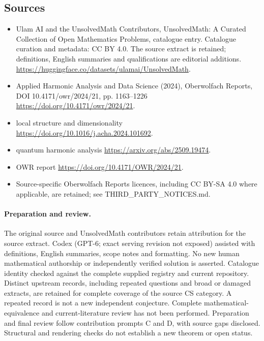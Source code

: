 \documentclass[11pt]{article}
\begin{document}
\subsection{Sources}
\begin{itemize}
\item[\hypertarget{source:statement:1}{S1}] Ulam AI and the UnsolvedMath Contributors, UnsolvedMath: A Curated Collection of Open Mathematics Problems, catalogue entry. Catalogue curation and metadata: CC BY 4.0. The source extract is retained; definitions, English summaries and qualifications are editorial additions.
\url{https://huggingface.co/datasets/ulamai/UnsolvedMath}.
\item[\hypertarget{source:statement:2}{S2}] Applied Harmonic Analysis and Data Science (2024), Oberwolfach Reports, DOI 10.4171/owr/2024/21, pp. 1163--1226
\url{https://doi.org/10.4171/owr/2024/21}.
\item[\hypertarget{source:statement:3}{S3}] local structure and dimensionality
\url{https://doi.org/10.1016/j.acha.2024.101692}.
\item[\hypertarget{source:statement:4}{S4}] quantum harmonic analysis
\url{https://arxiv.org/abs/2509.19474}.
\item[\hypertarget{source:statement:5}{S5}] OWR report
\url{https://doi.org/10.4171/OWR/2024/21}.
\item Source-specific Oberwolfach Reports licences, including CC BY-SA 4.0 where applicable, are retained; see THIRD\_PARTY\_NOTICES.md.
\end{itemize}
\paragraph{Preparation and review.}
The original source and UnsolvedMath contributors retain attribution for the source extract. Codex (GPT-6; exact serving revision not exposed) assisted with definitions, English summaries, scope notes and formatting. No new human mathematical authorship or independently verified solution is asserted. Catalogue identity checked against the complete supplied registry and current repository. Distinct upstream records, including repeated questions and broad or damaged extracts, are retained for complete coverage of the source CS category. A repeated record is not a new independent conjecture. Complete mathematical-equivalence and current-literature review has not been performed. Preparation and final review follow contribution prompts C and D, with source gaps disclosed. Structural and rendering checks do not establish a new theorem or open status.
\label{end:statement}
\end{document}
